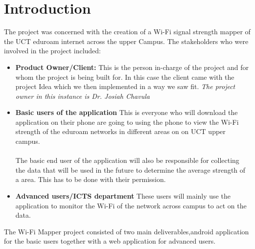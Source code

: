 \section{Introduction}
\label{ss:introduction}
The project was concerned with the creation of a Wi-Fi signal strength mapper of the UCT eduroam internet across the upper Campus.
The stakeholders who were involved in the project included:
\begin{itemize}
	\item \textbf{Product Owner/Client:} This is the person in-charge of the project and for whom the project is being built for. In this case the client came with the project Idea which we then implemented in a way we saw fit. \textit{The project owner in this instance is Dr. Josiah Chavula}
	\item \textbf{Basic users of the application} This is everyone who will download the application on their phone are going to using the phone to view the Wi-Fi strength of the eduroam networks in different areas on on UCT upper campus. 
	\paragraph{}The basic end user of the application will also be responsible for collecting the data that will be used in the future to determine the average strength of a area. This has to be done with their permission.
	\item \textbf{Advanced users/ICTS department} These users will mainly use the application to monitor the Wi-Fi of the network across campus to act on the data.
\end{itemize} The Wi-Fi Mapper project consisted of two main deliverables,android application for the basic users together with a web application for advanced users.
